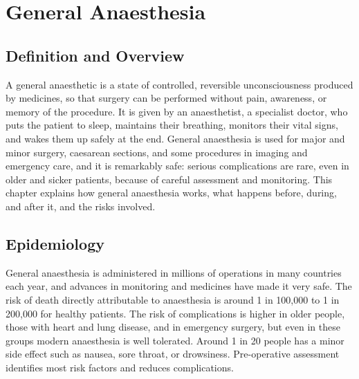 \chapter{General Anaesthesia}

\section*{Definition and Overview}
A general anaesthetic is a state of controlled, reversible unconsciousness produced by medicines, so that surgery can be performed without pain, awareness, or memory of the procedure. It is given by an anaesthetist, a specialist doctor, who puts the patient to sleep, maintains their breathing, monitors their vital signs, and wakes them up safely at the end. General anaesthesia is used for major and minor surgery, caesarean sections, and some procedures in imaging and emergency care, and it is remarkably safe: serious complications are rare, even in older and sicker patients, because of careful assessment and monitoring. This chapter explains how general anaesthesia works, what happens before, during, and after it, and the risks involved.

\section*{Epidemiology}
General anaesthesia is administered in millions of operations in many countries each year, and advances in monitoring and medicines have made it very safe. The risk of death directly attributable to anaesthesia is around 1 in 100,000 to 1 in 200,000 for healthy patients. The risk of complications is higher in older people, those with heart and lung disease, and in emergency surgery, but even in these groups modern anaesthesia is well tolerated. Around 1 in 20 people has a minor side effect such as nausea, sore throat, or drowsiness. Pre-operative assessment identifies most risk factors and reduces complications.

